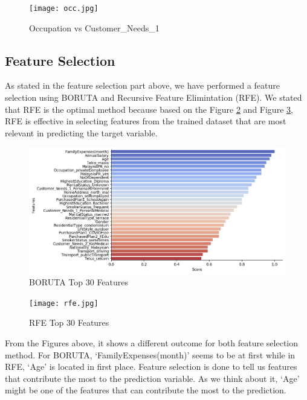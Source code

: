 \documentclass[11pt]{article}
\begin{document}
 \begin{figure}[H] 
     \centering
     \texttt{[image: occ.jpg]}
     \caption{Occupation vs Customer\_Needs\_1}
     \label{fig:occ.jpg}
 \end{figure}
\vspace{0.3cm}

\subsection{Feature Selection}
\hspace{0.5cm} As stated in the feature selection part above, we have performed a feature selection using BORUTA and Recursive Feature Elimintation (RFE). We stated that RFE is the optimal method because based on the Figure \ref{fig:boruta.jpg} and Figure \ref{fig:rfe.jpg}, RFE is effective in selecting features from the trained dataset that are most relevant in predicting the target variable.

 \begin{figure}[H] 
     \centering
     \includegraphics[width=1.2\textwidth]{boruta.jpg}
     \caption{BORUTA Top 30 Features}
     \label{fig:boruta.jpg}
 \end{figure}

\begin{figure}[H] 
     \centering
     \texttt{[image: rfe.jpg]}
     \caption{RFE Top 30 Features}
     \label{fig:rfe.jpg}
 \end{figure}

\hspace{0.5cm} From the Figures above, it shows a different outcome for both feature selection method. For BORUTA, `FamilyExpenses(month)' seems to be at first while in RFE, `Age' is located in first place. Feature selection is done to tell us features that contribute the most to the prediction variable. As we think about it, `Age' might be one of the features that can contribute the most to the prediction. 
\end{document}
